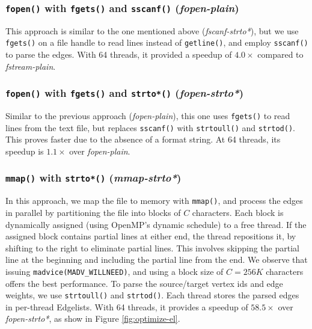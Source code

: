 


\subsubsection{\texttt{fopen()} with \texttt{fgets()} and \texttt{sscanf()} (\textit{fopen-plain})}
\label{sec:el-fopen-plain}

This approach is similar to the one mentioned above (\textit{fscanf-strto*}), but we use \texttt{fgets()} on a file handle to read lines instead of \texttt{getline()}, and employ \texttt{sscanf()} to parse the edges. With 64 threads, it provided a speedup of $4.0\times$ compared to \textit{fstream-plain}.


\subsubsection{\texttt{fopen()} with \texttt{fgets()} and \texttt{strto*()} (\textit{fopen-strto*})}
\label{sec:el-fopen-strto*}

Similar to the previous approach (\textit{fopen-plain}), this one uses \texttt{fgets()} to read lines from the text file, but replaces \texttt{sscanf()} with \texttt{strtoull()} and \texttt{strtod()}. This proves faster due to the absence of a format string. At 64 threads, its speedup is $1.1\times$ over \textit{fopen-plain}.


\subsubsection{\texttt{mmap()} with \texttt{strto*()} (\textit{mmap-strto*})}
\label{sec:el-mmap-strto*}

In this approach, we map the file to memory with \texttt{mmap()}, and process the edges in parallel by partitioning the file into blocks of $C$ characters. Each block is dynamically assigned (using OpenMP's dynamic schedule) to a free thread. If the assigned block contains partial lines at either end, the thread repositions it, by shifting to the right to eliminate partial lines. This involves skipping the partial line at the beginning and including the partial line from the end. We observe that issuing \texttt{madvice(MADV\_WILLNEED)}, and using a block size of $C=256K$ characters offers the best performance. To parse the source/target vertex ids and edge weights, we use \texttt{strtoull()} and \texttt{strtod()}. Each thread stores the parsed edges in per-thread Edgelists. With 64 threads, it provides a speedup of $58.5\times$ over \textit{fopen-strto*}, as show in Figure \ref{fig:optimize-el}.



